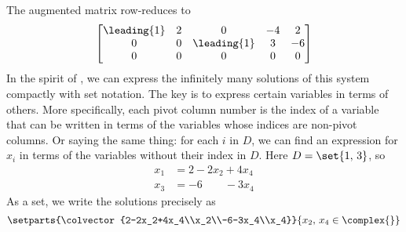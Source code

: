 The augmented matrix row-reduces to\\
%
\begin{equation*}
\begin{bmatrix}
\leading{1} &  2 &  0 &  -4 &  2\\ 
0 &  0 &  \leading{1} &  3 &  -6\\ 
0 &  0 &  0 &  0 &  0
\end{bmatrix}
\end{equation*}
%
In the spirit of , we can express the infinitely many solutions of this system compactly with set notation.  The key is to express certain variables in terms of others.  More specifically, each pivot column number is the index of a variable that can be written in terms of the variables whose indices are non-pivot columns.  Or saying the same thing: for each $i$ in $D$, we can find an expression for $x_i$ in terms of the variables without their index in $D$.  Here $D=\set{1,\,3}$, so
%
\begin{align*}
x_1&=2-2x_2+4x_4\\
x_3&=-6\quad\quad-3x_4
\end{align*}
%
As a set, we write the solutions precisely as
%
\begin{equation*}
\setparts{\colvector{2-2x_2+4x_4\\x_2\\-6-3x_4\\x_4}}{x_2,\,x_4\in\complex{\null}}
\end{equation*}

